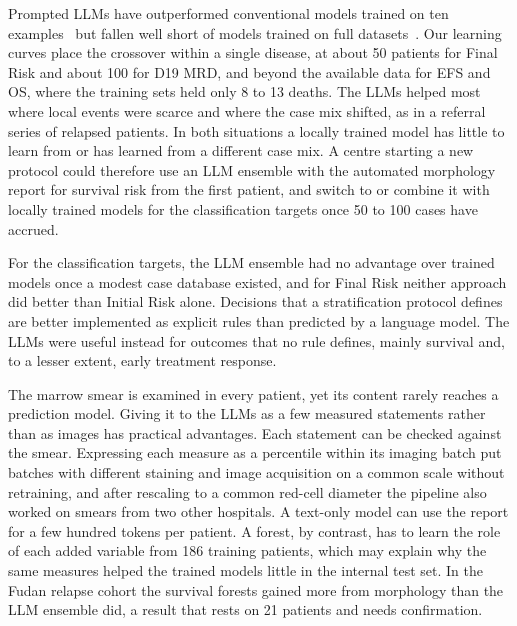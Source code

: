 \documentclass[pdflatex,sn-nature]{sn-jnl}
\begin{document}
Prompted LLMs have outperformed conventional models trained on ten
examples~\cite{[CITE:Zhu2026ClinicRealm]} but fallen well short of
models trained on full
datasets~\cite{[CITE:ClinicalBench2026],[CITE:Brown2025JAMIA]}.
Our learning curves place the crossover within a single disease, at
about 50 patients for Final Risk and about 100 for D19 MRD, and beyond
the available data for EFS and OS, where the training sets held only
8 to 13 deaths.
The LLMs helped most where local events were scarce and where the case
mix shifted, as in a referral series of relapsed patients.
In both situations a locally trained model has little to learn from or
has learned from a different case mix.
A centre starting a new protocol could therefore use an LLM ensemble
with the automated morphology report for survival risk from the first
patient, and switch to or combine it with locally trained models for
the classification targets once 50 to 100 cases have accrued.

For the classification targets, the LLM ensemble had no advantage over
trained models once a modest case database existed, and for Final Risk
neither approach did better than Initial Risk alone.
Decisions that a stratification protocol defines are better
implemented as explicit rules than predicted by a language model.
The LLMs were useful instead for outcomes that no rule defines, mainly
survival and, to a lesser extent, early treatment response.

The marrow smear is examined in every patient, yet its content rarely
reaches a prediction model.
Giving it to the LLMs as a few measured statements rather than as
images has practical advantages.
Each statement can be checked against the smear.
Expressing each measure as a percentile within its imaging batch put
batches with different staining and image acquisition on a common
scale without retraining, and after rescaling to a common red-cell
diameter the pipeline also worked on smears from two other hospitals.
A text-only model can use the report for a few hundred tokens per
patient.
A forest, by contrast, has to learn the role of each added variable
from 186 training patients, which may explain why the same measures
helped the trained models little in the internal test set.
In the Fudan relapse cohort the survival forests gained more from
morphology than the LLM ensemble did, a result that rests on 21
patients and needs confirmation.
\end{document}
